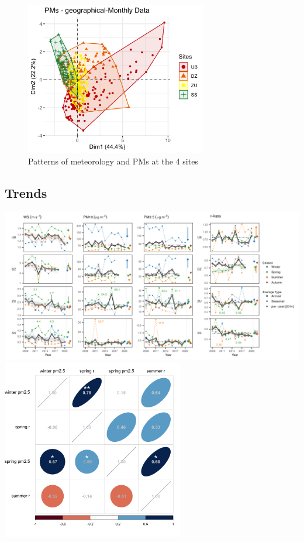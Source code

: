 \documentclass[
  11pt,
]{article}
\begin{document}
\begin{figure}
\centering
\includegraphics[width=3.125in,height=\textheight,keepaspectratio]{images/figure_7b.png}
\caption{Patterns of meteorology and PMs at the 4 sites}
\end{figure}

\newpage
\subsection{Trends}

\includegraphics[width=7.29167in,height=\textheight,keepaspectratio]{images/figure_8.png}
\includegraphics[width=3.125in,height=\textheight,keepaspectratio]{images/figure_9.png}
\end{document}
